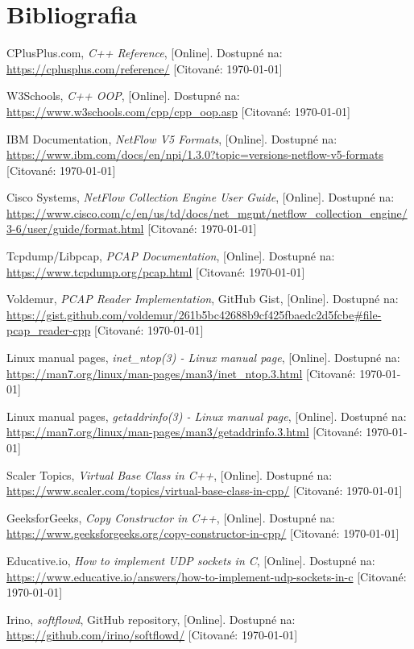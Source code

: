 \documentclass[a4paper, 12pt]{article}
\begin{document}
\section{Bibliografia}
\begin{thebibliography}{99}

CPlusPlus.com,
\emph{C++ Reference},
[Online]. Dostupné na: \url{https://cplusplus.com/reference/}
[Citované: \today]

W3Schools,
\emph{C++ OOP},
[Online]. Dostupné na: \url{https://www.w3schools.com/cpp/cpp_oop.asp}
[Citované: \today]

IBM Documentation,
\emph{NetFlow V5 Formats},
[Online]. Dostupné na: \url{https://www.ibm.com/docs/en/npi/1.3.0?topic=versions-netflow-v5-formats}
[Citované: \today]

Cisco Systems,
\emph{NetFlow Collection Engine User Guide},
[Online]. Dostupné na: \url{https://www.cisco.com/c/en/us/td/docs/net_mgmt/netflow_collection_engine/3-6/user/guide/format.html}
[Citované: \today]

Tcpdump/Libpcap,
\emph{PCAP Documentation},
[Online]. Dostupné na: \url{https://www.tcpdump.org/pcap.html}
[Citované: \today]

Voldemur,
\emph{PCAP Reader Implementation},
GitHub Gist,
[Online]. Dostupné na: \url{https://gist.github.com/voldemur/261b5bc42688b9cf425fbaedc2d5fcbe#file-pcap_reader-cpp}
[Citované: \today]

Linux manual pages,
\emph{inet\_ntop(3) - Linux manual page},
[Online]. Dostupné na: \url{https://man7.org/linux/man-pages/man3/inet_ntop.3.html}
[Citované: \today]

Linux manual pages,
\emph{getaddrinfo(3) - Linux manual page},
[Online]. Dostupné na: \url{https://man7.org/linux/man-pages/man3/getaddrinfo.3.html}
[Citované: \today]

Scaler Topics,
\emph{Virtual Base Class in C++},
[Online]. Dostupné na: \url{https://www.scaler.com/topics/virtual-base-class-in-cpp/}
[Citované: \today]

GeeksforGeeks,
\emph{Copy Constructor in C++},
[Online]. Dostupné na: \url{https://www.geeksforgeeks.org/copy-constructor-in-cpp/}
[Citované: \today]

Educative.io,
\emph{How to implement UDP sockets in C},
[Online]. Dostupné na: \url{https://www.educative.io/answers/how-to-implement-udp-sockets-in-c}
[Citované: \today]

Irino,
\emph{softflowd},
GitHub repository,
[Online]. Dostupné na: \url{https://github.com/irino/softflowd/}
[Citované: \today]

\end{thebibliography}
\end{document}
